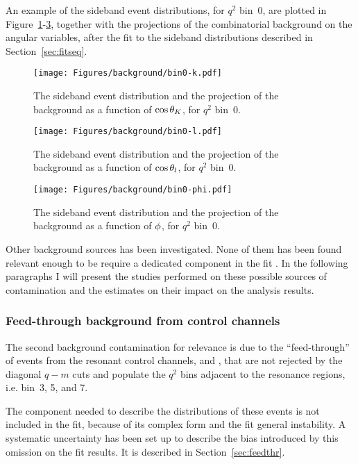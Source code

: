 An example of the sideband event distributions, for $q^2$ bin~0, are plotted in Figure~\ref{fig:bin0-bkg-k}-\ref{fig:bin0-bkg-phi}, together with the projections of the combinatorial background \pdf on the angular variables, after the fit to the sideband distributions described in Section~\ref{sec:fitseq}.

\begin{figure}[!hbt]
  \centering
  \texttt{[image: Figures/background/bin0-k.pdf]}
  \caption{The sideband event distribution and the projection of the background \pdf as a function of $\cos\theta_K$, for $q^2$ bin~0.}
  \label{fig:bin0-bkg-k}
\end{figure}

\begin{figure}[!hbt]
  \centering
  \texttt{[image: Figures/background/bin0-l.pdf]}
  \caption{The sideband event distribution and the projection of the background \pdf as a function of $\cos\theta_l$, for $q^2$ bin~0.}
  \label{fig:bin0-bkg-l}
\end{figure}

\begin{figure}[!hbt]
  \centering
  \texttt{[image: Figures/background/bin0-phi.pdf]}
  \caption{The sideband event distribution and the projection of the background \pdf as a function of $\phi$, for $q^2$ bin~0.}
  \label{fig:bin0-bkg-phi}
\end{figure}

Other background sources has been investigated.
None of them has been found relevant enough to be require a dedicated component in the fit \pdf.
In the following paragraphs I will present the studies performed on these possible sources of contamination and the estimates on their impact on the analysis results.

\subsubsection{Feed-through background from control channels}
\label{sec:feedThroughBkg}

The second background contamination for relevance is due to the ``feed-through'' of events from the resonant control channels, \BtoKstJpsi and \BtoKstpsip, that are not rejected by the diagonal $q-m$ cuts and populate the $q^2$ bins adjacent to the resonance regions, i.e. bin~3, 5, and 7.

The \pdf component needed to describe the distributions of these events is not included in the fit, because of its complex form and the fit general instability.
A systematic uncertainty has been set up to describe the bias introduced by this omission on the fit results.
It is described in Section~\ref{sec:feedthr}.

